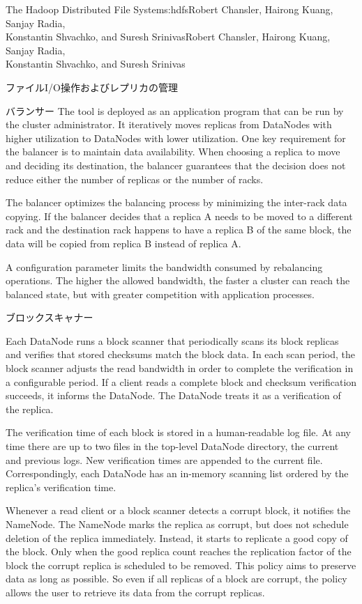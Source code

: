 \begin{aosachaptertoc}{The Hadoop Distributed File System}{s:hdfs}{Robert Chansler, Hairong Kuang, Sanjay Radia, \\ Konstantin Shvachko, and Suresh Srinivas}{Robert Chansler, Hairong Kuang, Sanjay Radia, \\ \hspace*{0.9cm} Konstantin Shvachko, and Suresh Srinivas}
\begin{aosasect1}{ファイルI/O操作およびレプリカの管理}
\begin{aosasect2}{バランサー}
The tool is deployed as an application program that can be run by the
cluster administrator. It iteratively moves replicas from DataNodes
with higher utilization to DataNodes with lower utilization. One key
requirement for the balancer is to maintain data availability. When
choosing a replica to move and deciding its destination, the balancer
guarantees that the decision does not reduce either the number of
replicas or the number of racks.

The balancer optimizes the balancing process by minimizing the
inter-rack data copying. If the balancer decides that a replica A
needs to be moved to a different rack and the destination rack happens
to have a replica B of the same block, the data will be copied from
replica B instead of replica A.

A configuration parameter limits the bandwidth consumed by rebalancing
operations. The higher the allowed bandwidth, the faster a cluster can
reach the balanced state, but with greater competition with
application processes.

\end{aosasect2}

\begin{aosasect2}{ブロックスキャナー}

Each DataNode runs a block scanner that periodically scans its block
replicas and verifies that stored checksums match the block data. In
each scan period, the block scanner adjusts the read bandwidth in
order to complete the verification in a configurable period. If a
client reads a complete block and checksum verification succeeds, it
informs the DataNode. The DataNode treats it as a verification of the
replica.

The verification time of each block is stored in a human-readable log
file. At any time there are up to two files in the top-level DataNode
directory, the current and previous logs. New verification times are
appended to the current file. Correspondingly, each DataNode has an
in-memory scanning list ordered by the replica's verification time.

Whenever a read client or a block scanner detects a corrupt block, it
notifies the NameNode. The NameNode marks the replica as corrupt, but
does not schedule deletion of the replica immediately. Instead, it
starts to replicate a good copy of the block. Only when the good
replica count reaches the replication factor of the block the corrupt
replica is scheduled to be removed. This policy aims to preserve data
as long as possible. So even if all replicas of a block are corrupt,
the policy allows the user to retrieve its data from the corrupt
replicas.


\end{aosasect2}
\end{aosasect1}
\end{aosachaptertoc}
